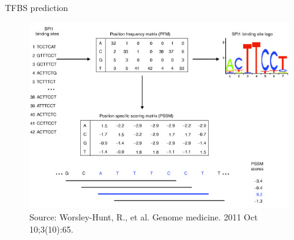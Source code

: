 \documentclass[slidestop,compress,11pt,xcolor=dvipsnames]{beamer}
\begin{document}
\begin{frame}[plain]{TFBS prediction}
 \vspace*{-0.3cm}
\begin{figure}
 \centering
 \includegraphics[width=0.95\linewidth]{intro/TFBS2.jpg}{\tiny{\\Source: Worsley-Hunt, R., et al.  Genome medicine. 2011 Oct 10;3(10):65. %
 }}
\end{figure}
\end{frame}
\end{document}
